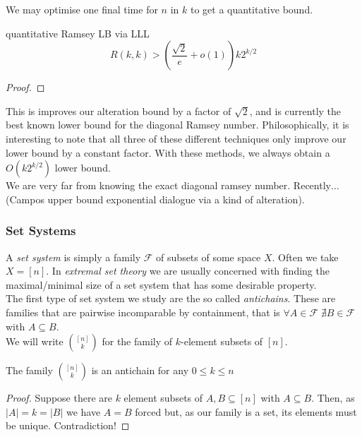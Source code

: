 \documentclass{article}
\begin{document}
We may optimise one final time for $n$ in $k$ to get a quantitative bound.

\begin{proposition}[]{quantitative Ramsey LB via LLL}
    \[R(k,k) > \left(\frac{\sqrt{2}}{e} + o(1)\right)k2^{k/2}\]
\end{proposition}

\begin{proof}
    
\end{proof}

This is improves our alteration bound by a factor of $\sqrt{2}$, and is currently the best known lower bound for 
the diagonal Ramsey number. Philosophically, it is interesting to note that all three of these different techniques 
only improve our lower bound by a constant factor. With these methods, we always obtain a $O(k2^{k/2})$ lower bound. \\

We are very far from knowing the exact diagonal ramsey number. Recently$\dots$ (Campos upper bound exponential 
dialogue via a kind of alteration). 

\subsubsection{Set Systems}

A {\it set system} is simply a family $\mathcal{F}$ of subsets of some space $X$. Often we take $X = [n]$. In 
{\it extremal set theory} we are usually concerned with finding the maximal/minimal size of a set system that 
has some desirable property. \\ 

The first type of set system we study are the so called {\it antichains}. These are families that are pairwise 
incomparable by containment, that is $\forall A \in \mathcal{F} \; \nexists B \in \mathcal{F}$ with $ A \subseteq B$. \\

We will write $\binom{[n]}{k}$ for the family of $k$-element subsets of $[n]$. 

\begin{claim}
    The family $\binom{[n]}{k}$ is an antichain for any $0 \leq k \leq n$
\end{claim}

\begin{proof}
    Suppose there are $k$ element subsets of $A, B \subseteq [n]$ with $A \subseteq B$. Then, as $|A| = k = |B|$ 
    we have $A = B$ forced but, as our family is a set, its elements must be unique. Contradiction!
\end{proof}
\end{document}
